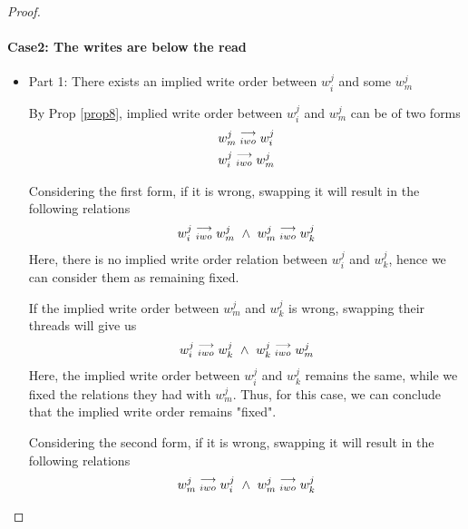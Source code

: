 \begin{proof}
\begin{itemize}
                    \end{itemize}

            \paragraph{Case2: The writes are below the read} 

                \begin{itemize}
                    \item Part 1: There exists an implied write order between $w_i^j$ and some $w_m^j$
                    
                        By Prop \ref{prop8}, implied write order between $w_i^j$ and $w_m^j$ can be of two forms 
                        \begin{align*}
                            w_m^j\stackrel{\longrightarrow}{_{iwo}}w_i^j \\ 
                            w_i^j\stackrel{\longrightarrow}{_{iwo}}w_m^j
                        \end{align*}

                        Considering the first form, if it is wrong, swapping it will result in the following relations 
                        \begin{align*}
                            \reln{w_i^j}{iwo}{w_m^j} \ \wedge \ \reln{w_m^j}{iwo}{w_k^j}
                        \end{align*}
                        Here, there is no implied write order relation between $w_i^j$ and $w_k^j$, hence we can consider them as remaining fixed. 

                        If the implied write order between $w_m^j$ and $w_k^j$ is wrong, swapping their threads will give us
                        \begin{align*}
                            \reln{w_i^j}{iwo}{w_k^j} \ \wedge \ \reln{w_k^j}{iwo}{w_m^j}
                        \end{align*} 
                        Here, the implied write order between $w_i^j$ and $w_k^j$ remains the same, while we fixed the relations they had with $w_m^j$. Thus, for this case, we can conclude that the implied write order remains "fixed".

                        Considering the second form, if it is wrong, swapping it will result in the following relations 
                        \begin{align*}
                            \reln{w_m^j}{iwo}{w_i^j} \ \wedge \ \reln{w_m^j}{iwo}{w_k^j}
                        \end{align*}


\end{itemize}
\end{proof}
